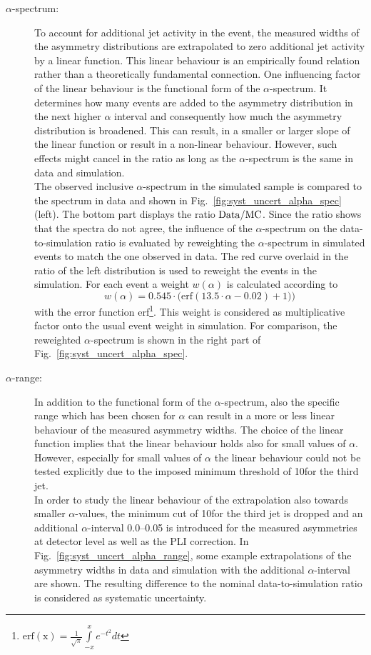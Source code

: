 \begin{description}
 \item[$\alpha$-spectrum:] To account for additional jet activity in the event, the measured widths of the asymmetry distributions are extrapolated to zero additional jet activity by a linear function. This linear behaviour is an empirically found relation rather than a theoretically fundamental connection. One influencing factor of the linear behaviour is the functional form of the $\alpha$-spectrum. It determines how many events are added to the asymmetry distribution in the next higher $\alpha$ interval and consequently how much the asymmetry distribution is broadened. This can result, \eg in a smaller or larger slope of the linear function or result in a non-linear behaviour. However, such effects might cancel in the ratio as long as the $\alpha$-spectrum is the same in data and simulation. \\
 The observed inclusive $\alpha$-spectrum in the simulated sample is compared to the spectrum in data and shown in Fig.~\ref{fig:syst_uncert_alpha_spec} (left). The bottom part displays the ratio $\rm{Data/MC}$. Since the ratio shows that the spectra do not agree, the influence of the $\alpha$-spectrum on the data-to-simulation ratio is evaluated by reweighting the $\alpha$-spectrum in simulated events to match the one observed in data. The red curve overlaid in the ratio of the left distribution is used to reweight the events in the simulation. For each event a weight $w(\alpha)$ is calculated according to 
\begin{equation}
w(\alpha) = 0.545 \cdot \mathrm{(erf}(13.5 \cdot \alpha -0.02) +1))
\end{equation}
with the error function erf\footnote{ $\mathrm{erf(x)} = \frac{1}{\sqrt{\pi}} \int\limits_{-x}^{x} e^{-t^2} dt$}. This weight is considered as multiplicative factor onto the usual event weight in simulation. For comparison, the reweighted $\alpha$-spectrum is shown in the right part of Fig.~\ref{fig:syst_uncert_alpha_spec}.
 
 \item[$\alpha$-range:] In addition to the functional form of the $\alpha$-spectrum, also the specific range which has been chosen for $\alpha$ can result in a more or less linear behaviour of the measured asymmetry widths. The choice of the linear function implies that the linear behaviour holds also for small values of $\alpha$. However, especially for small values of $\alpha$ the linear behaviour could not be tested explicitly due to the imposed minimum \pt threshold of 10\gev for the third jet. \\
In order to study the linear behaviour of the extrapolation also towards smaller $\alpha$-values, the minimum \pt cut of 10\gev for the third jet is dropped and an additional $\alpha$-interval 0.0--0.05 is introduced for the measured asymmetries at detector level as well as the PLI correction. In Fig.~\ref{fig:syst_uncert_alpha_range}, some example extrapolations of the asymmetry widths in data and simulation with the additional $\alpha$-interval are shown. The resulting difference to the nominal data-to-simulation ratio is considered as systematic uncertainty.


\end{description}
